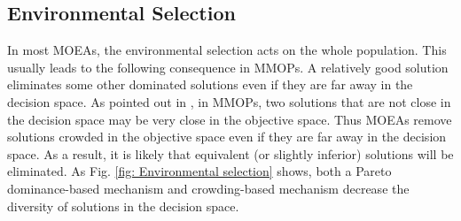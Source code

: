 \documentclass[conference]{IEEEtran}
\begin{document}
\subsection{Environmental Selection}
\label{Impact of environmental selection}
In most MOEAs, the environmental selection acts on the whole population. This usually leads to the following consequence in MMOPs.
A relatively good solution eliminates some other dominated solutions even if they are far away in the decision space. As pointed out in \cite{liang2016multimodal}, in MMOPs, two solutions that are not close in the decision space may be very close in the objective space. Thus MOEAs remove solutions crowded in the objective space even if they are far away in the decision space. As a result, it is likely that equivalent (or slightly inferior) solutions will be eliminated. As Fig. \ref{fig: Environmental selection} shows, both a Pareto dominance-based mechanism and crowding-based mechanism decrease the diversity of solutions in the decision space. 
\end{document}
